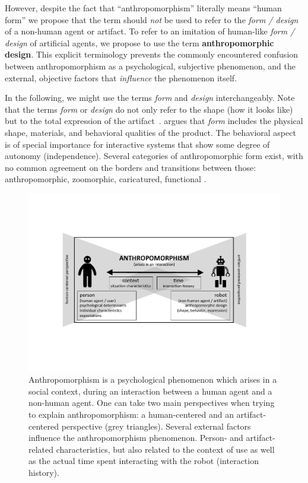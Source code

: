 \documentclass{frontiersSCNS} %
\begin{document}
However, despite the fact that ``anthropomorphism'' literally means ``human form'' we propose that the term should \textit{not} be used to refer to
the \textit{form / design} of a non-human agent or artifact. To refer to an imitation of
human-like \textit{form / design} of artificial agents, we propose to use the term
\textbf{anthropomorphic design}. This explicit terminology prevents the commonly
encountered confusion between anthropomorphism as a psychological, subjective
phenomenon, and the external, objective factors that \emph{influence} the
phenomenon itself.

In the following, we might use the terms \emph{form} and \emph{design}
interchangeably. Note that the terms \textit{form} or {\it design} do not only
refer to the shape (how it looks like) but to the total expression of the
artifact~\citep{bartneck_shaping_2004}. \citet{disalvo_hug:_2003} argues that
\textit{form} includes the physical shape, materials, and behavioral qualities
of the product. The behavioral aspect is of special importance for interactive
systems that show some degree of autonomy (independence).  Several categories of
anthropomorphic form exist, with no common agreement on the borders and
transitions between those: anthropomorphic, zoomorphic, caricatured, functional
\citep{fong_survey_2003}.

\begin{figure}
    \centering
    \includegraphics[width=0.75\columnwidth]{anthropo.pdf}
    \caption{Anthropomorphism is a psychological phenomenon which arises in a
        social context, during an
    interaction between a human agent and a non-human agent. One can take two main perspectives when trying to explain
    anthropomorphism: a human-centered and an artifact-centered perspective (grey
    triangles). Several external factors influence the anthropomorphism
    phenomenon. Person- and artifact-related characteristics, but also related to the
context of use as well as the actual time spent interacting with the robot (interaction history).}

    \label{fig:anthropofig}
\end{figure}
\end{document}
